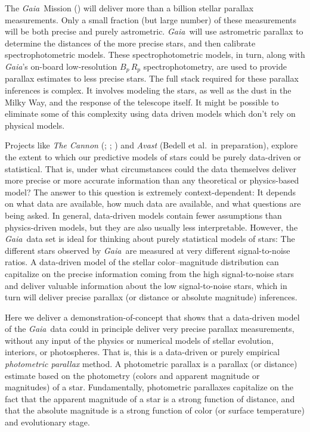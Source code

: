 \documentclass[modern]{aastex61}
\newcommand{\project}[1]{\textsl{#1}}
\newcommand{\gaia}{\project{Gaia}}
\begin{document}
The \gaia\ Mission (\citealt{gaia16}) will deliver more than a billion stellar parallax measurements.
Only a small fraction (but large number) of these
measurements will be both precise and purely astrometric.
\gaia\ will use astrometric parallax to determine the distances of the more precise
stars, and then calibrate spectrophotometric models.
These spectrophotometric models, in turn, along with \gaia's on-board
low-resolution $B_p\,R_p$ spectrophotometry, are used to provide
parallax estimates to less precise stars.
The full stack required for these parallax inferences is complex.
It involves modeling the stars, as well as the dust in the Milky Way,
and the response of the telescope itself.
It might be possible to eliminate some of this complexity using data driven models which don't rely on physical models.

Projects like \project{The Cannon} (\citealt{ness15}; \citealt{casey17}; \citealt{ho17})
and \project{Avast} (Bedell et al.\ in preparation),
explore the extent to which our predictive models of
stars could be purely data-driven or statistical.
That is, under what circumstances could the data themselves deliver
more precise or more accurate information than any theoretical or
physics-based model?
The answer to this question is extremely context-dependent: It depends
on what data are available, how much data are available, and what
questions are being asked.
In general, data-driven models contain fewer assumptions than
physics-driven models, but they are also usually less interpretable.
However, the \gaia\ data set is ideal for thinking about purely statistical
models of stars:
The different stars observed by \gaia\ are measured at very different
signal-to-noise ratios.
A data-driven model of the stellar color--magnitude distribution can capitalize
on the precise information coming from the high signal-to-noise stars
and deliver valuable information about the low signal-to-noise stars,
which in turn will deliver precise parallax (or distance or absolute magnitude) inferences.

Here we deliver a demonstration-of-concept that shows that a
data-driven model of the \gaia\ data could in principle deliver very
precise parallax measurements, without any input of the physics or numerical models of stellar
evolution, interiors, or photospheres.
That is, this is a data-driven or purely empirical \emph{photometric
  parallax} method.
A photometric parallax is a parallax (or distance) estimate based on
the photometry (colors and apparent magnitude or magnitudes) of a
star.
Fundamentally, photometric parallaxes capitalize on the fact that the
apparent magnitude of a star is a strong function of distance, and
that the absolute magnitude is a strong function of color (or surface
temperature) and evolutionary stage.
\end{document}
